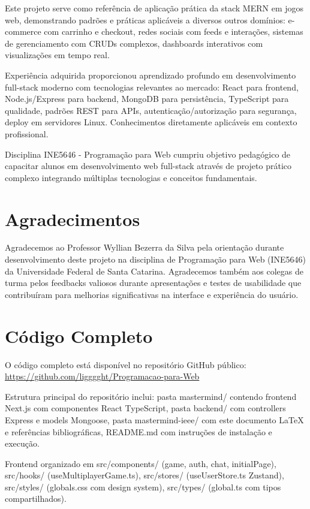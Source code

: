 \documentclass[conference]{IEEEtran}
\begin{document}
Este projeto serve como referência de aplicação prática da stack MERN em jogos web, demonstrando padrões e práticas aplicáveis a diversos outros domínios: e-commerce com carrinho e checkout, redes sociais com feeds e interações, sistemas de gerenciamento com CRUDs complexos, dashboards interativos com visualizações em tempo real.

Experiência adquirida proporcionou aprendizado profundo em desenvolvimento full-stack moderno com tecnologias relevantes ao mercado: React para frontend, Node.js/Express para backend, MongoDB para persistência, TypeScript para qualidade, padrões REST para APIs, autenticação/autorização para segurança, deploy em servidores Linux. Conhecimentos diretamente aplicáveis em contexto profissional.

Disciplina INE5646 - Programação para Web cumpriu objetivo pedagógico de capacitar alunos em desenvolvimento web full-stack através de projeto prático complexo integrando múltiplas tecnologias e conceitos fundamentais.

\section*{Agradecimentos}
Agradecemos ao Professor Wyllian Bezerra da Silva pela orientação durante desenvolvimento deste projeto na disciplina de Programação para Web (INE5646) da Universidade Federal de Santa Catarina. Agradecemos também aos colegas de turma pelos feedbacks valiosos durante apresentações e testes de usabilidade que contribuíram para melhorias significativas na interface e experiência do usuário.




\appendix

\section{Código Completo}

O código completo está disponível no repositório GitHub público: \url{https://github.com/ligggght/Programacao-para-Web}

Estrutura principal do repositório inclui: pasta mastermind/ contendo frontend Next.js com componentes React TypeScript, pasta backend/ com controllers Express e models Mongoose, pasta mastermind-ieee/ com este documento LaTeX e referências bibliográficas, README.md com instruções de instalação e execução.

Frontend organizado em src/components/ (game, auth, chat, initialPage), src/hooks/ (useMultiplayerGame.ts), src/stores/ (useUserStore.ts Zustand), src/styles/ (globals.css com design system), src/types/ (global.ts com tipos compartilhados).
\end{document}
